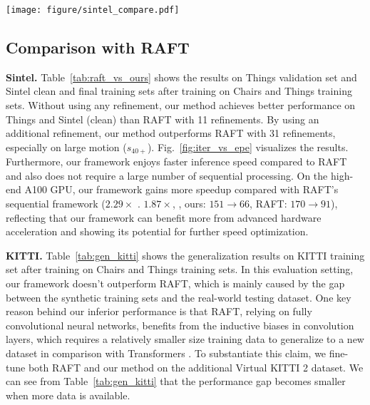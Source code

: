 \documentclass[10pt,twocolumn,letterpaper]{article}
\begin{document}
\begin{figure*}[t]
    \centering
    \texttt{[image: figure/sintel\_compare.pdf]}
    \vspace{-8pt}
    \caption{\textbf{Visual comparisons on Sintel test set}.}
    \label{fig:sintel_test}
    \vspace{-12pt}
\end{figure*}



\subsection{Comparison with RAFT}
\label{sec:compare_raft}



{\bf Sintel.} Table~\ref{tab:raft_vs_ours} shows the results on Things validation set and Sintel clean and final training sets after training on Chairs and Things training sets. Without using any refinement, our method achieves better performance on Things and Sintel (clean) than RAFT with 11 refinements. By using an additional refinement, our method outperforms RAFT with 31 refinements, especially on large motion ($s_{40+}$). Fig.~\ref{fig:iter_vs_epe} visualizes the results. Furthermore, our framework enjoys faster inference speed compared to RAFT and also does not require a large number of sequential processing. On the high-end A100 GPU, our framework gains more speedup compared with RAFT's sequential framework ($2.29\times$ \vs. $1.87 \times$, \ie, ours: $151 \to 66$, RAFT: $170 \to 91$), reflecting that our framework can benefit more from advanced hardware acceleration and showing its potential for further speed optimization.










{\bf KITTI.} Table~\ref{tab:gen_kitti} shows the generalization results on KITTI training set after training on Chairs and Things training sets. In this evaluation setting, our framework doesn't outperform RAFT, which is mainly caused by the gap between the synthetic training sets and the real-world testing dataset. One key reason behind our inferior performance is that RAFT, relying on fully convolutional neural networks, benefits from the inductive biases in convolution layers, which requires a relatively smaller size training data to generalize to a new dataset in comparison with Transformers \cite{dosovitskiy2020image, d2021convit,xu2021vitae,zhang2022vitaev2}. To substantiate this claim, we fine-tune both RAFT and our method on the additional Virtual KITTI 2 \cite{cabon2020virtual} dataset. We can see from Table~\ref{tab:gen_kitti} that the performance gap becomes smaller when more data is available.
\end{document}
